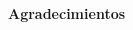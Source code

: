 
\begin{center} {\Large {\bf Agradecimientos}} 
\end{center}

\begin{linespacing}{1.0}

\end{linespacing}


